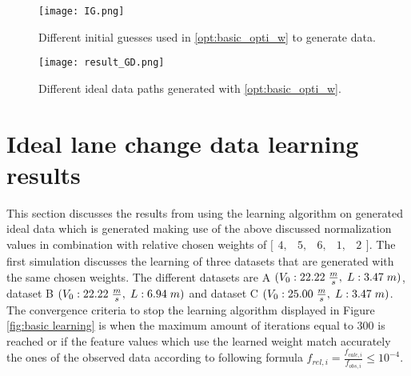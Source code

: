 

\begin{figure}[h!]
	\centering
	\texttt{[image: IG.png]}
	\caption{Different initial guesses used in \ref{opt:basic_opti_w} to generate data.}
	\label{fig:IG}
\end{figure}

\begin{figure}[h!]
	\centering
	\texttt{[image: result\_GD.png]}
	\caption{Different ideal data paths generated with \ref{opt:basic_opti_w}.}
	\label{fig:result_GD}
\end{figure}



\section{Ideal lane change data learning results} \label{s:ID_results}
This section discusses the results from using the learning algorithm on generated ideal data which is generated making use of the above discussed normalization values in combination with relative chosen weights of $ \bigl[ \begin{smallmatrix} 4,&5,&6,&1,&2\end{smallmatrix}\bigr]$. The first simulation discusses the learning of three datasets that are generated with the same chosen weights. The different datasets are A $(V_0:22.22\hspace{1mm}\frac{m}{s},\hspace{1mm} L:3.47\hspace{1mm}m)$, dataset B $(V_0:22.22\hspace{1mm}\frac{m}{s},\hspace{1mm} L:6.94\hspace{1mm}m)$ and dataset C $(V_0:25.00\hspace{1mm}\frac{m}{s},\hspace{1mm} L:3.47\hspace{1mm}m)$. The convergence criteria to stop the learning algorithm displayed in Figure \ref{fig:basic learning} is when the maximum amount of iterations equal to $300$ is reached or if the feature values which use the learned weight match accurately the ones of the observed data according to following formula $f_{rel,i} = \frac{f_{calc,i}}{f_{obs,i}} \leq 10^{-4}$.

